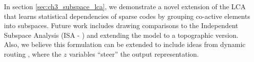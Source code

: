 In section \ref{sec:ch3_subspace_lca}, we demonstrate a novel extension of the LCA that learns statistical dependencies of sparse codes by grouping co-active elements into subspaces. Future work includes drawing comparisons to the Independent Subspace Analysis (ISA - \cite{hyvarinen2000emergence}) and extending the model to a topographic version. Also, we believe this formulation can be extended to include ideas from dynamic routing \parencite{olshausen1993neurobiological}, where the $z$ variables ``steer'' the output representation.